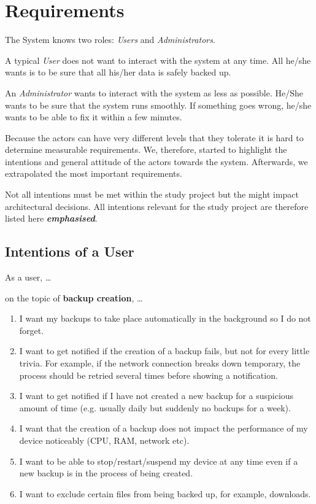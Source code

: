 \newcommand{\relevantreq}[1]{\textit{\textbf{#1}}}
\newcommand{\enumcountsave}{\setcounter{listcounter}{\value{enumi}}}
\newcommand{\enumcountrestore}{\setcounter{enumi}{\value{listcounter}}}

\section{Requirements}
\label{requirements}
The System knows two roles: \emph{Users} and \emph{Administrators}.

A typical \emph{User} does not want to interact with the system at any time.
All he/she wants is to be sure that all his/her data is safely backed
up.

An \emph{Administrator} wants to interact with the system as less as possible.
He/She wants to be sure that the system runs smoothly. If something goes
wrong, he/she wants to be able to fix it within a few minutes.

Because the actors can have very different levels that they tolerate it is hard to
determine measurable requirements. We, therefore, started to highlight the intentions
and general attitude of the actors towards the system. Afterwards, we extrapolated the most
important requirements.

Not all intentions must be met within the study project but the might %
impact architectural decisions. All intentions relevant for the study project are therefore listed here \relevantreq{emphasised}.


\subsection{Intentions of a User}
As a user, \ldots{}

\begin{flushright}
on the topic of \textbf{backup creation}, \ldots{}
\end{flushright}

\begin{enumerate}
	\item	I want my backups to take place automatically in the background so I do not forget.
	\item	I want to get notified if the creation of a backup fails, but not for every little trivia. For example, if the network connection breaks down temporary, the process should be retried several times before showing a notification.
	\item	I want to get notified if I have not created a new backup for a suspicious amount of time (e.g. usually daily but suddenly no backups for a week).
	\item	I want that the creation of a backup does not impact the performance of my device noticeably (CPU, RAM, network etc).
	\item	I want to be able to stop/restart/suspend my device at any time even if a new backup is in the process of being created.
	\item	I want to exclude certain files from being backed up, for example, downloads.
	\enumcountsave
\end{enumerate}

